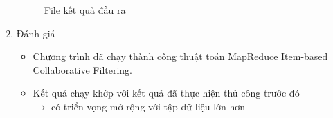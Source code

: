 \begin{enumerate}
\begin{figure}[ht]
              \caption{File kết quả đầu ra}
          \end{figure}
    \item Đánh giá
          \begin{itemize}
              \item Chương trình đã chạy thành công thuật toán MapReduce Item-based Collaborative Filtering.
              \item Kết quả chạy khớp với kết quả đã thực hiện thủ công trước đó \\ $\rightarrow$ có triển vọng mở rộng với tập dữ liệu lớn hơn
          \end{itemize}
\end{enumerate}
